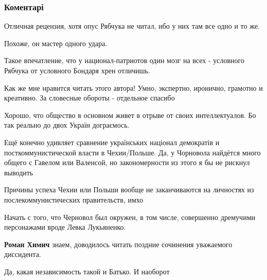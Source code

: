  
 
 
 
 
\subsubsection{Коментарі}

\begin{itemize} %
Отличная рецензия, хотя опус Рябчука не читал, ибо у них там все одно и то же.

\begin{itemize} %
Похоже, он мастер одного удара.

Такое впечатление, что у национал-патриотов один мозг на всех - условного Рябчука от условного Бондаря хрен отличишь.
\end{itemize} %


Как же мне нравится читать этого автора! Умно, экспертно, иронично, грамотно и
креативно. За словесные обороты - отдельное спасибо



Хорошо, что общество в основном живет в отрыве от своих интеллектуалов. Бо так
реально до двох Україн дограємось.

Ещё конечно удивляет сравнение українських націонал демократів и
посткоммунистической власти в Чехии/Польше. Да, у Чорновола найдётся много
общего с Гавелом или Валенсой, но закономерности из этого я бы не рискнул
выводить

Причины успеха Чехии или Польши вообще не заканчиваются на личностях из
послекоммунистических правительств, имхо

\begin{itemize} %
Начать с того, что Черновол был окружен, в том числе, совершенно дремучими персонажами вроде Левка Лукьяненко.

\textbf{Роман Химич} знаем, доводилось читать поздние сочинения уважаемого диссидента.

Да, какая независимость такой и Батько. И наоборот


\end{itemize}
\end{itemize}
